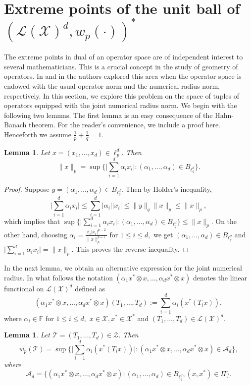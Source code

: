 \documentclass{amsart}
\newtheorem{lemma}[theorem]{Lemma}
\theoremstyle{definition}
\theoremstyle{remark}
\numberwithin{equation}{section}
\begin{document}
\section{Extreme points of the unit ball of $(\mathcal{L}(\mathcal{X})^d,w_p(\cdot))^*$}
The extreme points in dual of an operator space are of independent interest to several mathematicians. This is a crucial concept in the study of geometry of operators. In \cite{LO,RS} and in \cite{M2} the authors explored this area when the operator space is endowed with the usual operator norm and the numerical radius norm, respectively.  In this section, we explore this problem on the space of tuples of operators equipped with the joint numerical radius norm. We begin with the following two lemmas. The first lemma is an easy consequence of the Hahn-Banach theorem. For the reader's convenience, we include a proof here. Henceforth we assume $\frac{1}{p}+\frac{1}{q}=1.$
\begin{lemma}\label{lem-01}
Let $x=(x_1,\ldots,x_d)\in \ell_p^d.$ Then $$\|x\|_p=\sup\bigg\{\Big|\sum_{i=1}^d\alpha_ix_i\Big|:(\alpha_1,\ldots,\alpha_d)\in B_{\ell_q^d}\bigg\}.$$	
\end{lemma}
\begin{proof}
Suppose $y=(\alpha_1,\ldots,\alpha_d)\in B_{\ell_q^d}.$ Then by Holder's inequality, \[\Big|\sum_{i=1}^d\alpha_ix_i\Big|\leq \sum_{i=1}^d|\alpha_i||x_i|\leq \|y\|_q\|x\|_p\leq \|x\|_p,\]
which implies that	$\sup\bigg\{\Big|\sum_{i=1}^d\alpha_ix_i\Big|:(\alpha_1,\ldots,\alpha_d)\in B_{\ell_q^d}\bigg\}\leq \|x\|_p.$ On the other hand, choosing $\alpha_i=\frac{\overline{x_i}|x_i|^{p-2}}{\|x\|_p^{p-1}}$ for $1\leq i\leq d,$ we get $(\alpha_1,\ldots,\alpha_d)\in B_{\ell_q^d}$ and $\Big|\sum_{i=1}^d\alpha_ix_i\Big|=\|x\|_p.$ This proves the reverse inequality.
\end{proof}
In the next lemma, we obtain an alternative expression for the joint numerical radius. In what follows the notation $(\alpha_1x^*\otimes x,\ldots,\alpha_dx^*\otimes x)$ denotes the linear functional on $\mathcal{L}(\mathcal{X})^d$ defined as $$(\alpha_1x^*\otimes x,\ldots,\alpha_dx^*\otimes x)(T_1,\ldots,T_d):=\sum_{i=1}^d\alpha_i(x^*(T_ix)),$$ where $\alpha_i \in \mathbb{F}$ for $1\leq i\leq d,$ $x\in \mathcal{X}, x^*\in \mathcal{X}^*$  and $(T_1,\ldots,T_d)\in \mathcal{L}(\mathcal{X})^d.$ 
\begin{lemma}
	Let $\mathcal{T}=(T_1,\ldots,T_d)\in \mathcal{Z}.$ Then 
\[w_p(\mathcal{T})=\sup\bigg\{\Big|\sum_{i=1}^d\alpha_i(x^*(T_ix))\Big|:(\alpha_1x^*\otimes x,\ldots,\alpha_dx^*\otimes x)\in \mathcal{A}_d\bigg\},\] where 
\begin{equation}\label{eq-02}
\mathcal{A}_d=\{(\alpha_1x^*\otimes x,\ldots,\alpha_dx^*\otimes x):(\alpha_1,\ldots,\alpha_d)\in B_{\ell_q^d}, (x,x^*)\in \Pi\}.
\end{equation}
\end{lemma}
\end{document}
